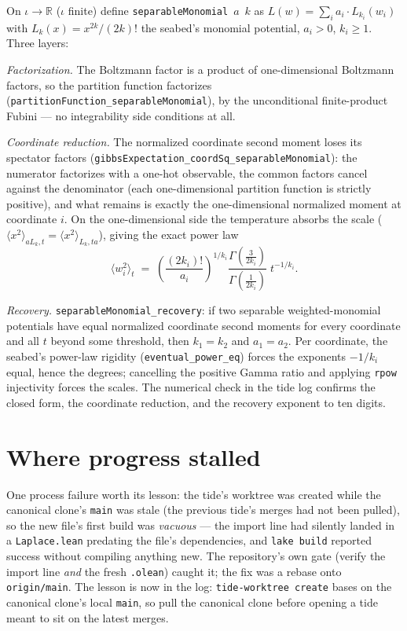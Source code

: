 \documentclass[11pt]{article}
\newcommand{\R}{\mathbb{R}}
\newcommand{\code}[1]{\texttt{#1}}
\begin{document}
On $\iota \to \R$ ($\iota$ finite) define
\code{separableMonomial}~$a$~$k$ as
$L(w) = \sum_i a_i \cdot L_{k_i}(w_i)$ with
$L_k(x) = x^{2k}/(2k)!$ the seabed's monomial potential, $a_i > 0$,
$k_i \ge 1$. Three layers:

\emph{Factorization.} The Boltzmann factor is a product of
one-dimensional Boltzmann factors, so the partition function
factorizes (\code{partitionFunction\_separableMonomial}), by the
unconditional finite-product Fubini --- no integrability side
conditions at all.

\emph{Coordinate reduction.} The normalized coordinate second moment
loses its spectator factors
(\code{gibbsExpectation\_coordSq\_separableMonomial}): the numerator
factorizes with a one-hot observable, the common factors cancel
against the denominator (each one-dimensional partition function is
strictly positive), and what remains is exactly the one-dimensional
normalized moment at coordinate $i$. On the one-dimensional side the
temperature absorbs the scale ($\langle x^2\rangle_{aL_k, t} =
\langle x^2\rangle_{L_k, ta}$), giving the exact power law
\[
  \bigl\langle w_i^2 \bigr\rangle_t \;=\;
  \left(\frac{(2k_i)!}{a_i}\right)^{1/k_i}
  \frac{\Gamma\!\left(\tfrac{3}{2k_i}\right)}
       {\Gamma\!\left(\tfrac{1}{2k_i}\right)}
  \; t^{-1/k_i}.
\]

\emph{Recovery.} \code{separableMonomial\_recovery}: if two separable
weighted-monomial potentials have equal normalized coordinate second
moments for every coordinate and all $t$ beyond some threshold, then
$k_1 = k_2$ and $a_1 = a_2$. Per coordinate, the seabed's power-law
rigidity (\code{eventual\_power\_eq}) forces the exponents
$-1/k_i$ equal, hence the degrees; cancelling the positive Gamma
ratio and applying \code{rpow} injectivity forces the scales. The
numerical check in the tide log confirms the closed form, the
coordinate reduction, and the recovery exponent to ten digits.

\section{Where progress stalled}

One process failure worth its lesson: the tide's worktree was created
while the canonical clone's \code{main} was stale (the previous
tide's merges had not been pulled), so the new file's first build was
\emph{vacuous} --- the import line had silently landed in a
\code{Laplace.lean} predating the file's dependencies, and
\code{lake build} reported success without compiling anything new.
The repository's own gate (verify the import line \emph{and} the
fresh \code{.olean}) caught it; the fix was a rebase onto
\code{origin/main}. The lesson is now in the log:
\code{tide-worktree create} bases on the canonical clone's local
\code{main}, so pull the canonical clone before opening a tide meant
to sit on the latest merges.
\end{document}
